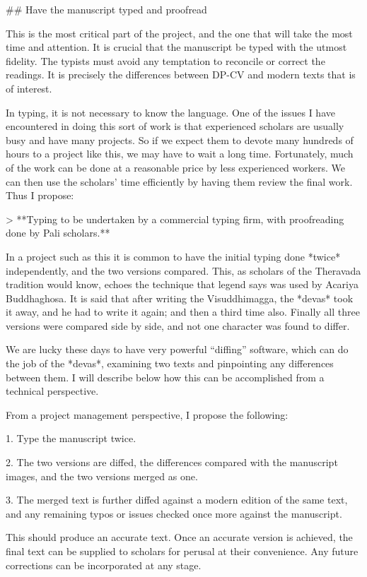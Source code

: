 \documentclass[11pt, openany,a5paper]{article}
\begin{document}
\begin{markdown}
## Have the manuscript typed and proofread

This is the most critical part of the project, and the one that will take the most time and attention. It is crucial that the manuscript be typed with the utmost fidelity. The typists must avoid any temptation to reconcile or correct the readings. It is precisely the differences between DP-CV and modern texts that is of interest.

In typing, it is not necessary to know the language. One of the issues I have encountered in doing this sort of work is that experienced scholars are usually busy and have many projects. So if we expect them to devote many hundreds of hours to a project like this, we may have to wait a long time. Fortunately, much of the work can be done at a reasonable price by less experienced workers. We can then use the scholars’ time efficiently by having them review the final work. Thus I propose:

> **Typing to be undertaken by a commercial typing firm, with proofreading done by Pali scholars.**

In a project such as this it is common to have the initial typing done *twice* independently, and the two versions compared. This, as scholars of the Theravada tradition would know, echoes the technique that legend says was used by Acariya Buddhaghosa. It is said that after writing the Visuddhimagga, the *devas* took it away, and he had to write it again; and then a third time also. Finally all three versions were compared side by side, and not one character was found to differ.

We are lucky these days to have very powerful “diffing” software, which can do the job of the *devas*, examining two texts and pinpointing any differences between them. I will describe below how this can be accomplished from a technical perspective.

From a project management perspective, I propose the following:

1. Type the manuscript twice.

2. The two versions are diffed, the differences compared with the manuscript images, and the two versions merged as one.

3. The merged text is further diffed against a modern edition of the same text, and any remaining typos or issues checked once more against the manuscript.

This should produce an accurate text. Once an accurate version is achieved, the final text can be supplied to scholars for perusal at their convenience. Any future corrections can be incorporated at any stage.


\end{markdown}
\end{document}
